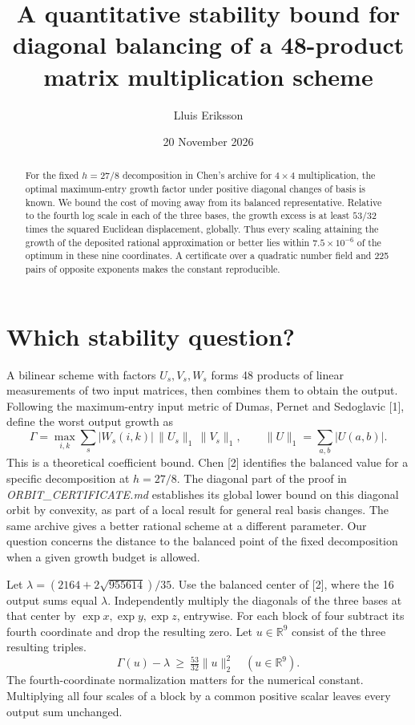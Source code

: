 \documentclass[11pt]{article}
\title{A quantitative stability bound for diagonal balancing of a 48-product matrix multiplication scheme}
\author{Lluis Eriksson}\date{20 November 2026}
\begin{document}
\maketitle
\begin{abstract}
For the fixed $h=27/8$ decomposition in Chen's archive for $4\times4$ multiplication, the optimal maximum-entry growth factor under positive diagonal changes of basis is known. We bound the cost of moving away from its balanced representative. Relative to the fourth log scale in each of the three bases, the growth excess is at least $53/32$ times the squared Euclidean displacement, globally. Thus every scaling attaining the growth of the deposited rational approximation or better lies within $7.5\times10^{-6}$ of the optimum in these nine coordinates. A certificate over a quadratic number field and 225 pairs of opposite exponents makes the constant reproducible.
\end{abstract}

\section{Which stability question?}
A bilinear scheme with factors $U_s,V_s,W_s$ forms 48 products of linear measurements of two input matrices, then combines them to obtain the output. Following the maximum-entry input metric of Dumas, Pernet and Sedoglavic [1], define the worst output growth as
\[
 \Gamma=\max_{i,k}\sum_s |W_s(i,k)|\,\|U_s\|_1\,\|V_s\|_1 ,
 \qquad \|U\|_1=\sum_{a,b}|U(a,b)|.
\]
This is a theoretical coefficient bound. Chen [2] identifies the balanced value for a specific decomposition at $h=27/8$. The diagonal part of the proof in \emph{ORBIT\_CERTIFICATE.md} establishes its global lower bound on this diagonal orbit by convexity, as part of a local result for general real basis changes. The same archive gives a better rational scheme at a different parameter. Our question concerns the distance to the balanced point of the fixed decomposition when a given growth budget is allowed.

Let $\lambda=(2164+2\sqrt{955614})/35$. Use the balanced center of [2], where the 16 output sums equal $\lambda$. Independently multiply the diagonals of the three bases at that center by $\exp x,\exp y,\exp z$, entrywise. For each block of four subtract its fourth coordinate and drop the resulting zero. Let $u\in\mathbb R^9$ consist of the three resulting triples.
\[
 \boxed{\quad \Gamma(u)-\lambda\ \geq\ \tfrac{53}{32}\|u\|_2^2
                 \quad (u\in\mathbb R^9).\quad} 
\]
The fourth-coordinate normalization matters for the numerical constant. Multiplying all four scales of a block by a common positive scalar leaves every output sum unchanged.
\end{document}
